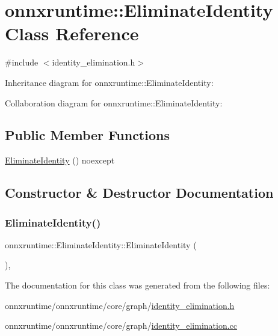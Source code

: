 \hypertarget{classonnxruntime_1_1EliminateIdentity}{}\section{onnxruntime\+:\+:Eliminate\+Identity Class Reference}
\label{classonnxruntime_1_1EliminateIdentity}


{\ttfamily \#include $<$identity\+\_\+elimination.\+h$>$}



Inheritance diagram for onnxruntime\+:\+:Eliminate\+Identity\+:


Collaboration diagram for onnxruntime\+:\+:Eliminate\+Identity\+:
\subsection*{Public Member Functions}
\begin{DoxyCompactItemize}
\item 
\mbox{\hyperlink{classonnxruntime_1_1EliminateIdentity_aea34a248c68766659d63a32c84bcf2d0}{Eliminate\+Identity}} () noexcept
\end{DoxyCompactItemize}


\subsection{Constructor \& Destructor Documentation}
\mbox{\label{classonnxruntime_1_1EliminateIdentity_aea34a248c68766659d63a32c84bcf2d0}} 
\subsubsection{\texorpdfstring{Eliminate\+Identity()}{EliminateIdentity()}}
{\footnotesize\ttfamily onnxruntime\+::\+Eliminate\+Identity\+::\+Eliminate\+Identity (\begin{DoxyParamCaption}{ }\end{DoxyParamCaption})\hspace{0.3cm}{\ttfamily [inline]}, {\ttfamily [noexcept]}}



The documentation for this class was generated from the following files\+:\begin{DoxyCompactItemize}
\item 
onnxruntime/onnxruntime/core/graph/\mbox{\hyperlink{identity__elimination_8h}{identity\+\_\+elimination.\+h}}\item 
onnxruntime/onnxruntime/core/graph/\mbox{\hyperlink{identity__elimination_8cc}{identity\+\_\+elimination.\+cc}}\end{DoxyCompactItemize}
